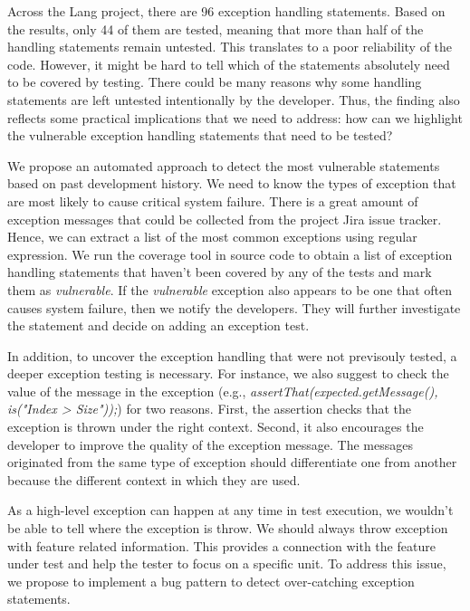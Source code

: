 		Across the Lang project, there are 96 exception handling statements. Based on the results, only 44 of them are tested, meaning that more than half of the handling statements remain untested. This translates to a poor reliability of the code. However, it might be hard to tell which of the statements absolutely need to be covered by testing. There could be many reasons why some handling statements are left untested intentionally by the developer. Thus, the finding also reflects some practical implications that we need to address: how can we highlight the vulnerable exception handling statements that need to be tested?


		We propose an automated approach to detect the most vulnerable statements based on past development history. We need to know the types of exception that are most likely to cause critical system failure. There is a great amount of exception messages that could be collected from the project Jira issue tracker. Hence, we can extract a list of the most common exceptions using regular expression. We run the coverage tool in source code to obtain a list of exception handling statements that haven't been covered by any of the tests and mark them as \textit{vulnerable}. If the \textit{vulnerable} exception also appears to be one that often causes system failure, then we notify the developers. They will further investigate the statement and decide on adding an exception test. 

		In addition, to uncover the exception handling that were not previsouly tested, a deeper exception testing is necessary. For instance, we also suggest to check the value of the message in the exception (e.g., \textit{assertThat(expected.getMessage(), is("Index > Size"));}) for two reasons. First, the assertion checks that the exception is thrown under the right context. Second, it also encourages the developer to improve the quality of the exception message. The messages originated from the same type of exception should differentiate one from another because the different context in which they are used.

 
		As a high-level exception can happen at any time in test execution, we wouldn't be able to tell where the exception is throw. We should always throw exception with feature related information. This provides a connection with the feature under test and help the tester to focus on a specific unit. To address this issue, we propose to implement a bug pattern to detect over-catching exception statements. 
	~\\

